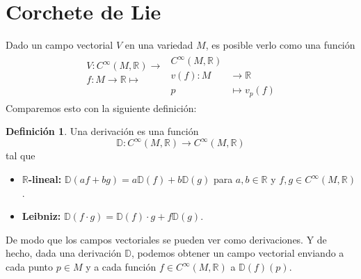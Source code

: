 \documentclass[spanish]{book}
\theoremstyle{definition}
\newtheorem*{defn}{Definición}
\newcommand{\R}{\mathbb{R}}
\newcommand{\Cinf}{C^\infty}
\begin{document}
	\section{Corchete de Lie}\label{sec:corchete-de-Lie}
	Dado un campo vectorial $V$ en una variedad $M$, es posible verlo como una función
	\begin{align*}
		\begin{aligned}
			V:\Cinf(M,\R)\longrightarrow\\
			f:M\to\R\mapsto\\\\
		\end{aligned}
		\begin{aligned}
			\Cinf(M,\R)\\
			v(f):M&\to\R\\
			p&\mapsto v_p(f)
		\end{aligned}
	\end{align*}
	Comparemos esto con la siguiente definición:
	\begin{defn}
		Una derivación es una función
		\[\mathbb{D}:\Cinf(M,\R)\to\Cinf(M,\R)\]
		tal que
		\begin{itemize}
			\item \textbf{$\R$-lineal:} $\mathbb{D}(af+bg)=a\mathbb{D}(f)+b\mathbb{D}(g)$ para $a,b\in\R$ y $f,g\in\Cinf(M,\R)$.
			\item \textbf{Leibniz:} $\mathbb{D}(f\cdot g)=\mathbb{D}(f)\cdot g+f\mathbb{D}(g)$.
		\end{itemize}
	\end{defn}
	De modo que los campos vectoriales se pueden ver como derivaciones. Y de hecho, dada una derivación $\mathbb{D}$, podemos obtener un campo vectorial enviando a cada punto $p\in M$ y a cada función $f\in\Cinf(M,\R)$ a $\mathbb{D}(f)(p)$.
	
\end{document}
